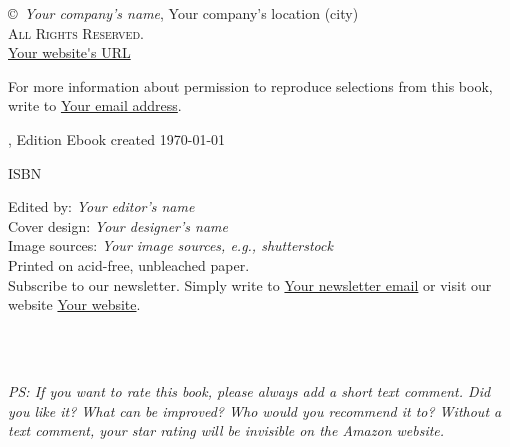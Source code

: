 \thispagestyle{empty}
\begin{center}

\copyright~\the\year \textit{Your company's name}, Your company's location (city)\\
\textsc{All Rights Reserved.}\\
\url{Your website's URL}

For more information about permission to reproduce selections from this book, write to \url{Your email address}.

\ifxetex
	\the\year, Edition
\else
	Ebook created \today
\fi

\ifxetex
	\textsc{ISBN}
\fi


Edited by: \emph{Your editor's name}\\
Cover design: \emph{Your designer's name}\\
Image sources: \emph{Your image sources, e.g., shutterstock}\\


\ifxetex
	Printed on acid\hyp{}free, unbleached paper.
\fi
~\\	

Subscribe to our newsletter. Simply write to \url{Your newsletter email} or visit our website \url{Your website}.

\ifxetex
\else
	~\\
	~\\\par	
	\textit{PS: If you want to rate this book, please always add a short text comment. Did you like it? What can be improved? Who would you recommend it to? Without a text comment, your star rating will be invisible on the Amazon website.}
	\myrule
\fi
	
\end{center}



